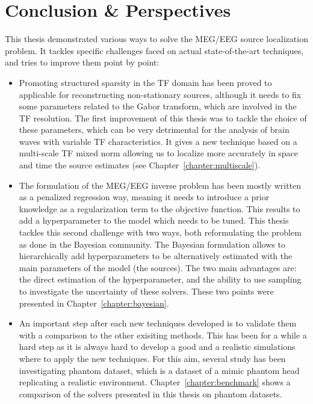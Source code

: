 
\chapter{Conclusion \& Perspectives}
\label{chapter:conclusion}

This thesis demonstrated various ways to solve the MEG/EEG source localization problem. It tackles specific challenges faced on actual state-of-the-art techniques, and tries to improve them point by point:
\begin{itemize}
\item Promoting structured sparsity in the TF domain has been proved to applicable for reconstructing non-stationary sources, although it needs to fix some parameters related to the Gabor transform, which are involved in the TF resolution. The first improvement of this thesis was to tackle the choice of these parameters, which can be very detrimental for the analysis of brain waves with variable TF characteristics. It gives a new technique based on a multi-scale TF mixed norm allowing us to localize more accurately in space and time the source estimates (see Chapter~\ref{chapter:multiscale}).

\item The formulation of the MEG/EEG inverse problem has been mostly written as a penalized regression way, meaning it needs to introduce a prior knowledge as a regularization term to the objective function. This results to add a hyperparameter to the model which needs to be tuned. This thesis tackles this second challenge with two ways, both reformulating the problem as done in the Bayesian community. The Bayesian formulation allows to hierarchically add hyperparameters to be alternatively estimated with the main parameters of the model (the sources). The two main advantages are: the direct estimation of the hyperparameter, and the ability to use sampling to investigate the uncertainty of these solvers. These two points were presented in Chapter~\ref{chapter:bayesian}.

\item An important step after each new techniques developed is to validate them with a comparison to the other exisiting methods. This has been for a while a hard step as it is always hard to develop a good and a realistic simulations where to apply the new techniques. For this aim, several study has been investigating phantom dataset, which is a dataset of a mimic phantom head replicating a realistic environment. Chapter~\ref{chapter:benchmark} shows a comparison of the solvers presented in this thesis on phantom datasets.
\end{itemize}

